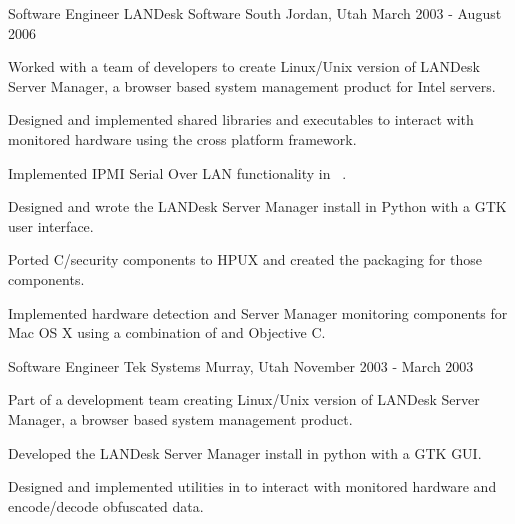 \begin{cventries}
  \cventry
    {Software Engineer} %
    {LANDesk Software} %
    {South Jordan, Utah} %
    {March 2003 - August 2006} %
    {
      \begin{cvitems} %
      	\item {Worked with a team of developers to create Linux/Unix version of LANDesk Server Manager, a browser based system management product for Intel servers.}
      	\item {Designed and implemented shared libraries and executables to interact with monitored hardware using the cross platform \Cpp{} framework.}
      	\item {Implemented IPMI Serial Over LAN functionality in \
      		\Cpp{}.}
      	\item {Designed and wrote the LANDesk Server Manager install in Python with a GTK user interface.}
      	\item {Ported C/\Cpp security components to HPUX and created the packaging for those components.}
      	\item {Implemented hardware detection and Server Manager monitoring components for Mac OS X using a combination of \Cpp{} and Objective C.}
      \end{cvitems}
    }

  \cventry
    {Software Engineer}
    {Tek Systems}
    {Murray, Utah}
    {November 2003 - March 2003}
    {
  	  \begin{cvitems} %
	    \item {Part of a development team creating Linux/Unix version of LANDesk Server Manager, a browser based system management product.}
	    \item {Developed the LANDesk Server Manager install in python with a GTK GUI.}
        \item {Designed and implemented utilities in \Cpp{} to interact with monitored hardware and encode/decode obfuscated data.}
      \end{cvitems}
    }
  

\end{cventries}
